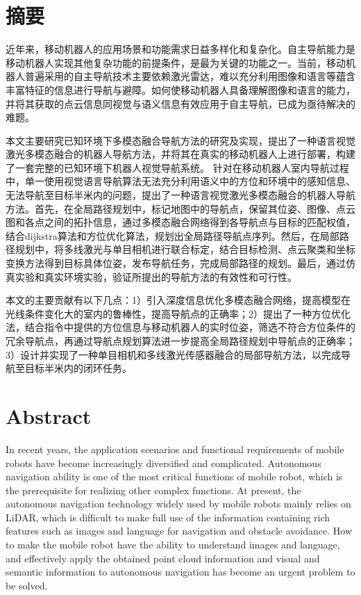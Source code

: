 \chapter{摘\texorpdfstring{\quad}{}要}
    近年来，移动机器人的应用场景和功能需求日益多样化和复杂化。自主导航能力是移动机器人实现其他复杂功能的前提条件，是最为关键的功能之一。当前，移动机器人普遍采用的自主导航技术主要依赖激光雷达，难以充分利用图像和语言等蕴含丰富特征的信息进行导航与避障。如何使移动机器人具备理解图像和语言的能力，并将其获取的点云信息同视觉与语义信息有效应用于自主导航，已成为亟待解决的难题。
    
    本文主要研究已知环境下多模态融合导航方法的研究及实现，提出了一种语言视觉激光多模态融合的机器人导航方法，并将其在真实的移动机器人上进行部署，构建了一套完整的已知环境下机器人视觉导航系统。
    针对在移动机器人室内导航过程中，单一使用视觉语言导航算法无法充分利用语义中的方位和环境中的感知信息、无法导航至目标半米内的问题，提出了一种语言视觉激光多模态融合的机器人导航方法。首先，在全局路径规划中，标记地图中的导航点，保留其位姿、图像、点云图和各点之间的拓扑信息，通过多模态融合网络得到各导航点与目标的匹配权值，结合dijkstra算法和方位优化算法，规划出全局路径导航点序列。然后，在局部路径规划中，将多线激光与单目相机进行联合标定，结合目标检测、点云聚类和坐标变换方法得到目标具体位姿，发布导航任务，完成局部路径的规划。最后，通过仿真实验和真实环境实验，验证所提出的导航方法的有效性和可行性。
    
    本文的主要贡献有以下几点：1）引入深度信息优化多模态融合网络，提高模型在光线条件变化大的室内的鲁棒性，提高导航点的正确率；2）提出了一种方位优化法，结合指令中提供的方位信息与移动机器人的实时位姿，筛选不符合方位条件的冗余导航点，再通过导航点规划算法进一步提高全局路径规划中导航点的正确率；3）设计并实现了一种单目相机和多线激光传感器融合的局部导航方法，以完成导航至目标半米内的闭环任务。


\chapter{Abstract}
    In recent years, the application scenarios and functional requirements of mobile robots have become increasingly diversified and complicated. Autonomous navigation ability is one of the most critical functions of mobile robot, which is the prerequisite for realizing other complex functions. At present, the autonomous navigation technology widely used by mobile robots mainly relies on LiDAR, which is difficult to make full use of the information containing rich features such as images and language for navigation and obstacle avoidance. How to make the mobile robot have the ability to understand images and language, and effectively apply the obtained point cloud information and visual and semantic information to autonomous navigation has become an urgent problem to be solved.

